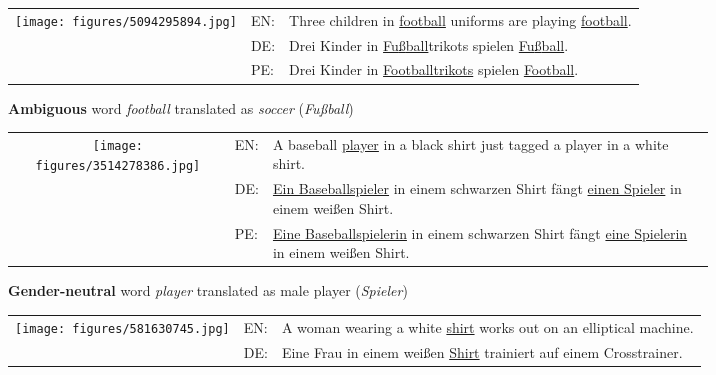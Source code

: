 \documentclass[11pt,a4paper]{article}
\begin{document}
\begin{figure*}[t]
\small{
  \begin{subfigure}[c]{\textwidth}
  \vspace{1em}
    \begin{tabular}{c p{0.3cm}p{11cm}}
      \multirow{3}[15]{*}{\texttt{[image: figures/5094295894.jpg]}} & EN: & Three children in \underline{football} uniforms are playing \underline{football}. \\[1ex]
      & DE: & Drei Kinder in \underline{Fu{\ss}ball}trikots spielen \underline{Fu{\ss}ball}. \\[1ex] 
      & PE: & Drei Kinder in \underline{Footballtrikots}  spielen \underline{Football}. \\[1ex] 
  \end{tabular}
  \vspace{3em}
  \caption{\textbf{Ambiguous} word {\em football} translated as {\em soccer} ({\em Fu{\ss}ball})}
  \end{subfigure}
\begin{subfigure}[c]{\textwidth}
  \vspace{1em}
    \begin{tabular}{c p{0.3cm}p{11cm}}
      \multirow{3}[15]{*}{\texttt{[image: figures/3514278386.jpg]}} & EN: & A baseball \underline{player} in a black shirt just tagged a player in a white shirt.\\[1ex]
      & DE: & \underline{Ein Baseballspieler} in einem schwarzen Shirt f\"{a}ngt \underline{einen Spieler} in einem wei{\ss}en Shirt.\\[1ex]
      & PE: & \underline{Eine Baseballspielerin} in einem schwarzen Shirt f\"{a}ngt \underline{eine Spielerin} in einem wei{\ss}en Shirt. \\[1ex]
  \end{tabular}
  \vspace{3em}
\caption{\textbf{Gender-neutral} word {\em player} translated as male player ({\em Spieler})}
  \end{subfigure}
\begin{subfigure}[c]{\textwidth}
  \vspace{1em}
    \begin{tabular}{c p{0.3cm}p{11cm}}
      \multirow{3}{*}{\texttt{[image: figures/581630745.jpg]}} & EN: & A woman wearing a white \underline{shirt} works out on an elliptical machine.\\[1ex]
      & DE: & Eine Frau in einem wei{\ss}en \underline{Shirt} trainiert auf einem Crosstrainer.\\[1ex]

\end{tabular}
\end{subfigure}}
\end{figure*}
\end{document}
